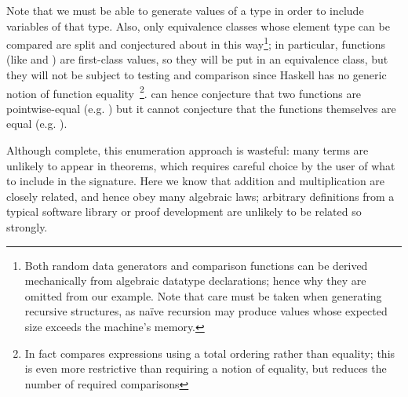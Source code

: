 Note that we must be able to generate values of a type in order to include
variables of that type. Also, only equivalence classes whose element type can be
compared are split and conjectured about in this way\footnote{Both random data
  generators and comparison functions can be derived mechanically from algebraic
  datatype declarations; hence why they are omitted from our example. Note that
  care must be taken when generating recursive structures, as na\"ive recursion
  may produce values whose expected size exceeds the machine's memory.}; in
particular, functions (like  and ) are first-class values, so
they will be put in an equivalence class, but they will not be subject to
testing and comparison since Haskell has no generic notion of function
equality~\footnote{In fact \quickspec{} compares expressions using a total
  ordering rather than equality; this is even more restrictive than requiring a
  notion of equality, but reduces the number of required comparisons}.
\quickspec{} can hence conjecture that two functions are pointwise-equal (e.g.
) but it cannot conjecture that the functions themselves are
equal (e.g. ).

Although complete, this enumeration approach is wasteful: many terms are
unlikely to appear in theorems, which requires careful choice by the user of
what to include in the signature. Here we know that addition and multiplication
are closely related, and hence obey many algebraic laws; arbitrary definitions
from a typical software library or proof development are unlikely to be related
so strongly.

\iffalse
\quickspec{} (and \hipspec{}) is also compatible with Haskell's existing testing
infrastructure, such that an invocation of \texttt{cabal test} can run these
tools alongside more traditional QA tools like \quickcheck{}, \textsc{HUnit} and
\textsc{Criterion}.

In fact, there are similarities between the way a TE system like \quickspec{} can
generalise from checking \emph{particular} properties to \emph{inventing} new
ones, and the way counterexample finders like \quickcheck{} can generalise from
testing \emph{particular} expressions to \emph{inventing} expressions to
test. One of our aims is to understand the implications of this generalisation,
the lessons that each can learn from the other's approach to term generation,
and the consequences for testing and QA in general.
\fi


